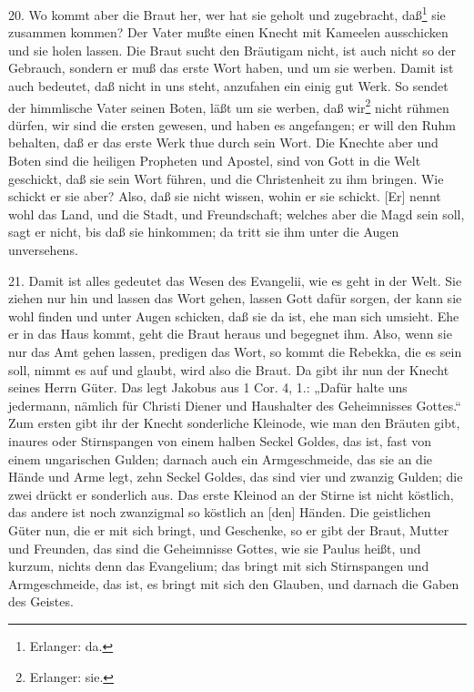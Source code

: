 20. Wo kommt aber die Braut her, wer hat sie geholt und zugebracht, daß\footnote{Erlanger: da.} sie zusammen kommen? Der Vater mußte einen Knecht mit Kameelen ausschicken und sie holen lassen. Die Braut sucht den Bräutigam nicht, ist auch nicht so der Gebrauch, sondern er muß das erste Wort haben, und um sie werben. Damit ist auch bedeutet, daß nicht in uns steht, anzufahen ein einig gut Werk. So sendet der himmlische Vater seinen Boten, läßt um sie werben, daß wir\footnote{Erlanger: sie.} nicht rühmen dürfen, wir sind die ersten gewesen, und haben es angefangen; er will den Ruhm behalten, daß er das erste Werk thue durch sein Wort. Die Knechte aber und Boten sind die heiligen Propheten und Apostel, sind von Gott in die Welt geschickt, daß sie sein Wort führen, und die Christenheit zu ihm bringen. Wie schickt er sie aber? Also, daß sie nicht wissen, wohin er sie schickt. [Er] nennt wohl das Land, und die Stadt, und Freundschaft; welches aber die Magd sein soll, sagt er nicht, bis daß sie hinkommen; da tritt sie ihm unter die Augen unversehens.

21. Damit ist alles gedeutet das Wesen des Evangelii, wie es geht in der Welt. Sie ziehen nur hin und lassen das Wort gehen, lassen Gott dafür sorgen, der kann sie wohl finden und unter Augen schicken, daß sie da ist, ehe man sich umsieht. Ehe er in das Haus kommt, geht die Braut heraus und begegnet ihm. Also, wenn sie nur das Amt gehen lassen, predigen das Wort, so kommt die Rebekka, die es sein soll, nimmt es auf und glaubt, wird also die Braut. Da gibt ihr nun der Knecht seines Herrn Güter. Das legt Jakobus aus 1 Cor. 4, 1.: „Dafür halte uns jedermann, nämlich für Christi Diener und Haushalter des Geheimnisses Gottes.“ Zum ersten gibt ihr der Knecht sonderliche Kleinode, wie man den Bräuten gibt, inaures oder Stirnspangen von einem halben Seckel Goldes, das ist, fast von einem ungarischen Gulden; darnach auch ein Armgeschmeide, das sie an die Hände und Arme legt, zehn Seckel Goldes, das sind vier und zwanzig Gulden; die zwei drückt er sonderlich aus. Das erste Kleinod an der Stirne ist nicht köstlich, das andere ist noch zwanzigmal so köstlich an [den] Händen. Die geistlichen Güter nun, die er mit sich bringt, und Geschenke, so er gibt der Braut, Mutter und Freunden, das sind die Geheimnisse Gottes, wie sie Paulus heißt, und kurzum, nichts denn das Evangelium; das bringt mit sich Stirnspangen und Armgeschmeide, das ist, es bringt mit sich den Glauben, und darnach die Gaben des Geistes.

